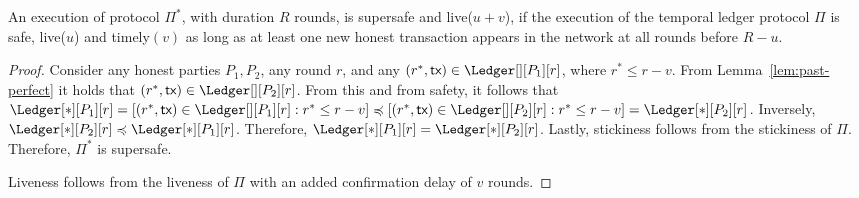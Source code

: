 \begin{theorem} \label{thm:timeliness-to-supersafety}
  An execution of protocol $\Pi^*$, with duration $R$ rounds, is supersafe
  and live($u + v$), if the execution of the
  temporal ledger protocol $\Pi$ is safe, live($u$) and timely$(v)$
  as long as at least one new honest transaction appears in the
  network at all rounds before $R - u$.
\end{theorem}
\begin{proof}
  Consider any honest parties $P_1,P_2$, any round $r$, and any
  $(r^*, \tx) \in \Ledger[][P_1][r]$, where $r^* \leq r - v$.
  From Lemma~\ref{lem:past-perfect} it holds that
  $(r^*, \tx) \in \Ledger[][P_2][r]$.
  From this and from safety, it follows that
  $\Ledger[*][P_1][r] = [(r^*, \tx) \in \Ledger[][P_1][r]: r^* \leq r - v] \preccurlyeq
  [(r^*, \tx) \in \Ledger[][P_2][r]: r^* \leq r - v] = \Ledger[*][P_2][r]$.
  Inversely, $\Ledger[*][P_2][r] \preccurlyeq \Ledger[*][P_1][r]$.
  Therefore, $\Ledger[*][P_1][r] = \Ledger[*][P_2][r]$.
  Lastly, stickiness follows from the stickiness of $\Pi$.
  Therefore, $\Pi^*$ is supersafe.

  Liveness follows from the liveness of $\Pi$ with an added
  confirmation delay of $v$ rounds.
  \Qed
\end{proof}

